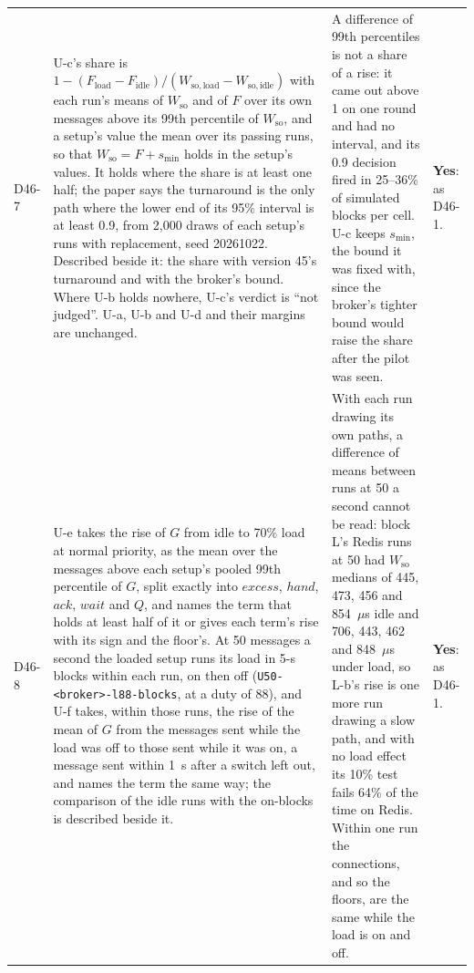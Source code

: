 \documentclass[11pt]{article}
\begin{document}
{\begin{longtable}{@{}p{1.1cm} >{\raggedright\arraybackslash}p{6.1cm} >{\raggedright\arraybackslash}p{6.0cm} >{\raggedright\arraybackslash}p{2.2cm}@{}}
D46-7 & U-c's share is $1 - (F_{\mathrm{load}} - F_{\mathrm{idle}})/(W_{\mathrm{so,load}} - W_{\mathrm{so,idle}})$ with each run's means of $W_{\mathrm{so}}$ and of $F$ over its own messages above its 99th percentile of $W_{\mathrm{so}}$, and a setup's value the mean over its passing runs, so that $W_{\mathrm{so}} = F + s_{\min}$ holds in the setup's values. It holds where the share is at least one half; the paper says the turnaround is the only path where the lower end of its 95\% interval is at least 0.9, from 2,000 draws of each setup's runs with replacement, seed 20261022. Described beside it: the share with version 45's turnaround and with the broker's bound. Where U-b holds nowhere, U-c's verdict is ``not judged''. U-a, U-b and U-d and their margins are unchanged. & A difference of 99th percentiles is not a share of a rise: it came out above 1 on one round and had no interval, and its 0.9 decision fired in 25--36\% of simulated blocks per cell. U-c keeps $s_{\min}$, the bound it was fixed with, since the broker's tighter bound would raise the share after the pilot was seen. & \textbf{Yes}: as D46-1. \\
D46-8 & U-e takes the rise of $G$ from idle to 70\% load at normal priority, as the mean over the messages above each setup's pooled 99th percentile of $G$, split exactly into $\mathit{excess}$, $\mathit{hand}$, $\mathit{ack}$, $\mathit{wait}$ and $Q$, and names the term that holds at least half of it or gives each term's rise with its sign and the floor's. At 50 messages a second the loaded setup runs its load in 5-s blocks within each run, on then off (\texttt{U50-<broker>-l88-blocks}, at a duty of 88), and U-f takes, within those runs, the rise of the mean of $G$ from the messages sent while the load was off to those sent while it was on, a message sent within 1~s after a switch left out, and names the term the same way; the comparison of the idle runs with the on-blocks is described beside it. & With each run drawing its own paths, a difference of means between runs at 50 a second cannot be read: block L's Redis runs at 50 had $W_{\mathrm{so}}$ medians of 445, 473, 456 and 854~$\mu$s idle and 706, 443, 462 and 848~$\mu$s under load, so L-b's rise is one more run drawing a slow path, and with no load effect its 10\% test fails 64\% of the time on Redis. Within one run the connections, and so the floors, are the same while the load is on and off. & \textbf{Yes}: as D46-1. \\

\end{longtable}}
\end{document}
